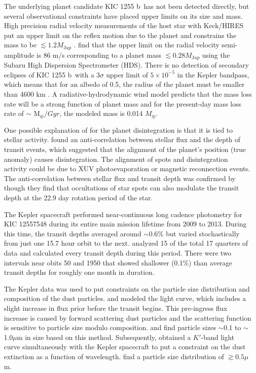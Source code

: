 \documentclass[preprint]{aastex61}
\newcommand{\sha}{KIC 1255 b}
\begin{document}
The underlying planet candidate \sha\ has not been detected directly, but several observational constraints have placed upper limits on its size and mass.
High precision radial velocity measurements of the host star with Keck/HIRES put an upper limit on the reflex motion due to the planet and constrains the mass to be $\lesssim 1.2 M_{\mathrm Jup}$ \citep{croll2014}.
\citet{masuda2018rvKIC1255} find that the upper limit on the radial velocity semi-amplitude is 86 m/s corresponding to a planet mass $\lesssim 0.28 M_{\mathrm Jup}$ using the Subaru High Dispersion Spectrometer (HDS).
There is no detection of secondary eclipses of \sha\ with a 3$\sigma$ upper limit of $5 \times 10^{-5}$ in the Kepler bandpass, which means that for an albedo of 0.5, the radius of the planet must be smaller than 4600 km \citep{vanWerkhoven2014}.
A radiative-hydrodynamic wind model predicts that the mass loss rate will be a strong function of planet mass and for the present-day mass loss rate of $\sim$ M$_\oplus/Gyr$, the modeled mass is 0.014 $M_\oplus$.

One possible explanation of for the planet disintegration is that it is tied to stellar activity.
\citet{kawahara2013starspots} found an anti-correlation between stellar flux and the depth of transit events, which suggested that the alignment of the planet's position (true anomaly) causes disintegration.
The alignment of spots and disintegration activity could be due to XUV photoevaporation or magnetic reconnection events.
The anti-correlation between stellar flux and transit depth was confirmed by \citet{croll2015starspots} though they find that occultations of star spots can also modulate the transit depth at the 22.9 day rotation period of the star.

The Kepler spacecraft performed near-continuous long cadence photometry for KIC 12557548 during its entire main mission lifetime from 2009 to 2013.
During this time, the transit depths averaged around $\sim$0.6\% but varied stochastically from just one 15.7 hour orbit to the next.
\citet{vanWerkhoven2014} analyzed 15 of the total 17 quarters of data and calculated every transit depth during this period.
There were two intervals near obits 50 and 1950 that showed shallower (0.1\%) than average transit depths for roughly one month in duration.

The Kepler data was used to put constraints on the particle size distribution and composition of the dust particles.
\citet{budaj12} and \citet{brogi2012} modeled the light curve, which includes a slight increase in flux prior before the transit begins.
This pre-ingress flux increase is caused by forward scattering dust particles and the scattering function is sensitive to particle size modulo composition.
\citet{budaj12} and \citet{brogi2012} find particle sizes $\sim$0.1 to $\sim$1.0$\mu$m in size based on this method.
Subsequently, \citet{croll2014} obtained a $K'$-band light curve simultaneously with the Kepler spacecraft to put a constraint on the dust extinction as a function of wavelength.
\citet{croll2014} find a particle size distribution of $\gtrsim 0.5\mu$m.
\end{document}
